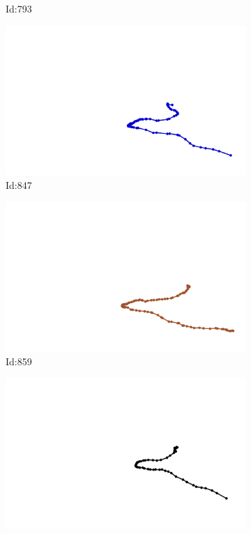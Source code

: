 \documentclass[12pt,twoside]{report}
\begin{document}
\begin{figure}
\begin{subfigure}[b]{0.20\textwidth}
\caption{Id:793}
\end{subfigure}
\begin{subfigure}[b]{0.20\textwidth}
\centering
\includegraphics[width=\textwidth]{../trajectories/847.png}
\caption{Id:847}
\end{subfigure}
\begin{subfigure}[b]{0.20\textwidth}
\centering
\includegraphics[width=\textwidth]{../trajectories/859.png}
\caption{Id:859}
\end{subfigure}
\begin{subfigure}[b]{0.20\textwidth}
\centering
\includegraphics[width=\textwidth]{../trajectories/878.png}

\end{subfigure}
\end{figure}
\end{document}

